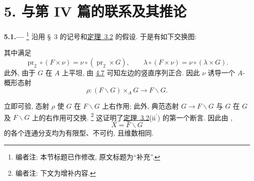 
\section*{5. 与第 IV 篇的联系及其推论}
\label{sec:sga3-VIA-5}

\medskip
{}\label{par:sga3-VIA-5.1}%
\noindent\textbf{5.1.---}%
\footnote{\label{note:sga3-VIA-49}编者注: 本节标题已作修改,
原文标题为“补充”.}
沿用 \S~3 的记号和\hyperref[thm:sga3-VIA-3.2]{定理~3.2} 的假设.
于是有如下交换图:
\begin{center}
  \label{diag:sga3-VIA-5.1-right-action}%
\end{center}
其中满足
\[
  \operatorname{pr}_2\circ(F\times\nu)
    =
  \nu\circ(\operatorname{pr}_2\times G),
  \qquad
  \lambda\circ(F\times\nu)
    =
  \nu\circ(\lambda\times G).
\]
此外, 由于 \(G\) 在 \(A\) 上平坦,
由 \hyperref[par:sga3-VIA-4.7]{4.7} 可知左边的竖直序列正合.
因此 \(\nu\) 诱导一个 \(A\)-概形态射
\[
  \rho:(F\backslash G)\times_A G\longrightarrow F\backslash G.
\]

立即可验, 态射 \(\rho\) 使 \(G\) 在 \(F\backslash G\) 上右作用;
此外, 典范态射 \(G\to F\backslash G\) 与 \(G\) 在 \(G\)
及 \(F\backslash G\) 上的右作用可交换.%
\footnote{\label{note:sga3-VIA-50}编者注: 下文为增补内容.}
这证明了\hyperref[concl:sga3-VIA-3.2-ii-prime]{定理~3.2}(ii\(^{\prime}\)) 的第一个断言.
因此由 ,
\[
  X=F\backslash G
\]
的各个连通分支均为有限型、不可约, 且维数相同.

